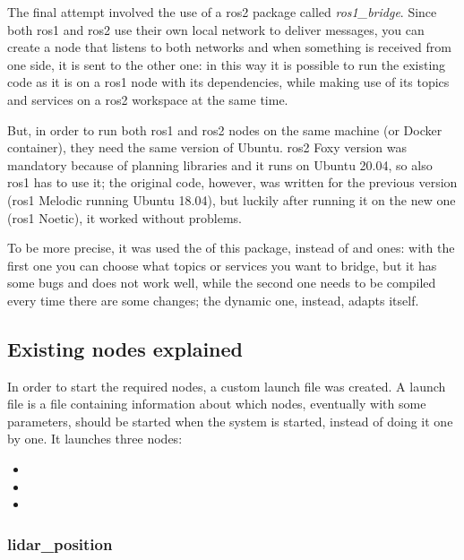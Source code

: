 The final attempt involved the use of a \acrshort{ros}2 package called \textit{ros1\_bridge}. Since both \acrshort{ros}1 and \acrshort{ros}2 use their own local network to deliver messages, you can create a node that listens to both networks and when something is received from one side, it is sent to the other one: in this way it is possible to run the existing code as it is on a \acrshort{ros}1 node with its dependencies, while making use of its topics and services on a \acrshort{ros}2 workspace at the same time.

But, in order to run both \acrshort{ros}1 and \acrshort{ros}2 nodes on the same machine (or Docker container), they need the same version of Ubuntu. \acrshort{ros}2 Foxy version was mandatory because of planning libraries and it runs on Ubuntu 20.04, so also \acrshort{ros}1 has to use it; the original code, however, was written for the previous version (\acrshort{ros}1 Melodic running Ubuntu 18.04), but luckily after running it on the new one (\acrshort{ros}1 Noetic), it worked without problems.

To be more precise, it was used the  of this package, instead of  and  ones: with the first one you can choose what topics or services you want to bridge, but it has some bugs and does not work well, while the second one needs to be compiled every time there are some changes; the dynamic one, instead, adapts itself.

\subsection{Existing nodes explained}
\label{subsec:nodes}

In order to start the required nodes, a custom launch file was created. A launch file is a file containing information about which nodes, eventually with some parameters, should be started when the system is started, instead of doing it one by one. It launches three nodes:

\begin{itemize}
    \item {}
    \item {}
    \item {}
\end{itemize}

\subsubsection{lidar\_position}

